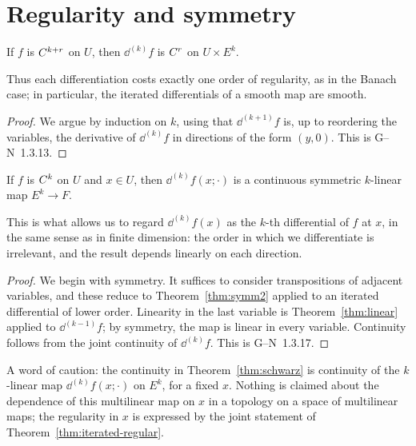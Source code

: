 \section{Regularity and symmetry}

\begin{theorem}
  \label{thm:iterated-regular}
  \leanok
  If $f$ is $C^{k + r}$ on $U$, then $\dd^{(k)} f$ is $C^{r}$ on $U \times E^k$.
\end{theorem}

Thus each differentiation costs exactly one order of regularity, as in the Banach case; in
particular, the iterated differentials of a smooth map are smooth.

\begin{proof}
  \leanok
  We argue by induction on $k$, using that $\dd^{(k+1)} f$ is, up to reordering the variables,
  the derivative of $\dd^{(k)} f$ in directions of the form $(y, 0)$. This is G--N~1.3.13.
\end{proof}

\begin{theorem}[Schwarz]
  \label{thm:schwarz}
  \leanok
  If $f$ is $C^{k}$ on $U$ and $x \in U$, then $\dd^{(k)} f(x; \cdot)$ is a continuous
  symmetric $k$-linear map $E^k \to F$.
\end{theorem}

This is what allows us to regard $\dd^{(k)} f(x)$ as the $k$-th differential of $f$ at $x$, in
the same sense as in finite dimension: the order in which we differentiate is irrelevant, and
the result depends linearly on each direction.

\begin{proof}
  \leanok
  We begin with symmetry. It suffices to consider transpositions of adjacent variables, and
  these reduce to Theorem~\ref{thm:symm2} applied to an iterated differential of lower order.
  Linearity in the last variable is Theorem~\ref{thm:linear} applied to $\dd^{(k-1)} f$; by
  symmetry, the map is linear in every variable. Continuity follows from the joint continuity
  of $\dd^{(k)} f$. This is G--N~1.3.17.
\end{proof}

\begin{remark}
  A word of caution: the continuity in Theorem~\ref{thm:schwarz} is continuity of the
  $k$-linear map $\dd^{(k)} f(x; \cdot)$ on $E^k$, for a fixed $x$. Nothing is claimed about
  the dependence of this multilinear map on $x$ in a topology on a space of multilinear maps;
  the regularity in $x$ is expressed by the joint statement of
  Theorem~\ref{thm:iterated-regular}.
\end{remark}
